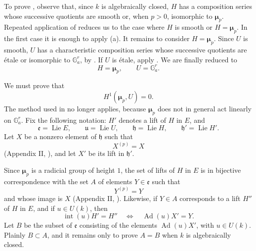 To prove , observe that, since \(k\) is algebraically
closed, \(H\) has a composition series whose successive quotients
are smooth or, when \(p>0\), isomorphic to \(\boldsymbol\mu_p\).
Repeated application of  reduces us to the case where \(H\) is
smooth or \(H=\boldsymbol\mu_p\).  In the first case it is enough to
apply (a).  It remains to consider \(H=\boldsymbol\mu_p\).
Since \(U\) is smooth, \(U\) has a characteristic composition series
whose successive quotients are étale or isomorphic to
\(\mathbb G_a^r\), by .  If \(U\) is étale, apply .  We are
finally reduced to
\[
  H=\boldsymbol\mu_p,\qquad U=\mathbb G_a^r.
\]

We must prove that
\[
  H^1(\boldsymbol\mu_p,U)=0.
\]
The method used in  no longer applies, because
\(\boldsymbol\mu_p\) does not in general act linearly on
\(\mathbb G_a^r\).  Fix the following notation: \(H'\) denotes a
lift of \(H\) in \(E\), and
\[
  \mathfrak e=\operatorname{Lie}E,\qquad
  \mathfrak u=\operatorname{Lie}U,\qquad
  \mathfrak h=\operatorname{Lie}H,\qquad
  \mathfrak h'=\operatorname{Lie}H'.
\]
Let \(X\) be a nonzero element of \(\mathfrak h\) such that
\[
  X^{(p)}=X
\]
(Appendix II, ), and let \(X'\) be its lift in \(\mathfrak h'\).

Since \(\boldsymbol\mu_p\) is a radicial group of height \(1\), the
set of lifts of \(H\) in \(E\) is in bijective correspondence with
the set \(A\) of elements \(Y\in\mathfrak e\) such that
\[
  Y^{(p)}=Y
\]
and whose image is \(X\) (Appendix II, ).  Likewise, if
\(Y\in A\) corresponds to a lift \(H''\) of \(H\) in \(E\), and if
\(u\in U(k)\), then
\[
  \operatorname{int}(u)H'=H''
  \quad\Longleftrightarrow\quad
  \operatorname{Ad}(u)X'=Y.
\]
Let \(B\) be the subset of \(\mathfrak e\) consisting of the
elements \(\operatorname{Ad}(u)X'\), with \(u\in U(k)\).  Plainly
\(B\subset A\), and it remains only to prove \(A=B\) when \(k\) is
algebraically closed.

